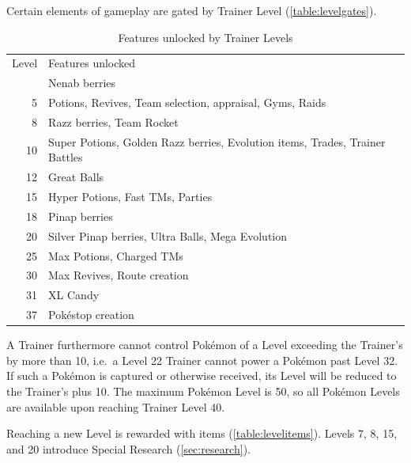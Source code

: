 Certain elements of gameplay are gated by Trainer Level (\autoref{table:levelgates}).
\begin{table}[ht]
\begin{center}
  \begin{tabular}{r p{}}
  Level & Features unlocked \\
\Midrule
  2 & Nenab berries \\
  5 & Potions, Revives, Team selection, appraisal, Gyms, Raids \\
  8 & Razz berries, Team Rocket \\
  10 & Super Potions, Golden Razz berries, Evolution items, Trades, Trainer Battles \\
  12 & Great Balls \\
  15 & Hyper Potions, Fast TMs, Parties \\
  18 & Pinap berries \\
  20 & Silver Pinap berries, Ultra Balls, Mega Evolution \\
  25 & Max Potions, Charged TMs \\
  30 & Max Revives, Route creation \\
  31 & XL Candy \\
  37 & Pokéstop creation \\
\end{tabular}
\caption{Features unlocked by Trainer Levels}
\label{table:levelgates}
\end{center}
\end{table}
A Trainer furthermore cannot control Pokémon of a Level exceeding the Trainer's by more than 10,
  i.e.\ a Level 22 Trainer cannot power a Pokémon past Level 32.
If such a Pokémon is captured or otherwise received, its Level will be
  reduced to the Trainer's plus 10.
The maximum Pokémon Level is 50, so all Pokémon Levels are available upon
  reaching Trainer Level 40.

Reaching a new Level is rewarded with items (\autoref{table:levelitems}).
Levels 7, 8, 15, and 20 introduce Special Research (\autoref{sec:research}).

